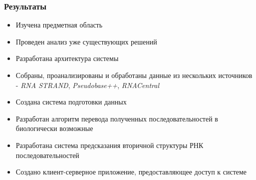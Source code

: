 \documentclass{beamer}
\begin{document}
\begin{frame}
  \transwipe[direction=90]
  \frametitle{Результаты}
  \begin{itemize}
    \item Изучена предметная область
    \item Проведен анализ уже существующих решений
    \item Разработана архитектура системы
    \item Собраны, проанализированы и обработаны данные из нескольких источников - \textit{RNA STRAND}, \textit{Pseudobase++}, \textit{RNACentral}
    \item Создана система подготовки данных
    \item Разработан алгоритм перевода полученных последовательностей в биологически возможные
    \item Разработана система предсказания вторичной структуры РНК последовательностей
    \item Создано клиент-серверное приложение, предоставляющее доступ к системе
  \end{itemize}
\end{frame}
\end{document}
